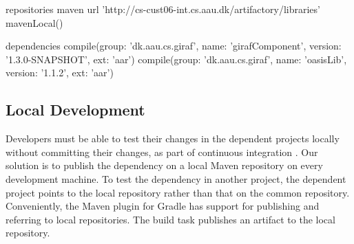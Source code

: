 \begin{gradlecode}[caption={Dependency declaration for a Giraf project},label={lst:dependency_declaration_giraf}]
repositories {
    maven {
        url 'http://cs-cust06-int.cs.aau.dk/artifactory/libraries'
    }
    mavenLocal()
}

dependencies {
    compile(group: 'dk.aau.cs.giraf', name: 'girafComponent', version: '1.3.0-SNAPSHOT', ext: 'aar')
    compile(group: 'dk.aau.cs.giraf', name: 'oasisLib', version: '1.1.2', ext: 'aar')
}
\end{gradlecode}

\subsection{Local Development}
Developers must be able to test their changes in the dependent projects locally without committing their changes, as part of continuous integration \parencite{fowlerCI}. Our solution is to publish the dependency on a local Maven repository on every development machine. To test the dependency in another project, the dependent project points to the local repository rather than that on the common repository. Conveniently, the Maven plugin for Gradle has support for publishing and referring to local repositories. The build task  publishes an artifact to the local repository.


